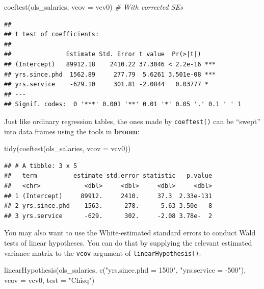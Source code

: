 \documentclass[
  12pt,
  oneside,openany]{book}
\newenvironment{Shaded}{\begin{snugshade}}{\end{snugshade}}
\newcommand{\AttributeTok}[1]{\textcolor[rgb]{0.77,0.63,0.00}{#1}}
\newcommand{\CommentTok}[1]{\textcolor[rgb]{0.56,0.35,0.01}{\textit{#1}}}
\newcommand{\FunctionTok}[1]{\textcolor[rgb]{0.00,0.00,0.00}{#1}}
\newcommand{\NormalTok}[1]{#1}
\newcommand{\StringTok}[1]{\textcolor[rgb]{0.31,0.60,0.02}{#1}}
\begin{document}
\begin{Shaded}
\begin{Highlighting}[]
\FunctionTok{coeftest}\NormalTok{(ols\_salaries, }\AttributeTok{vcov =}\NormalTok{ vcv0)  }\CommentTok{\# With corrected SEs}
\end{Highlighting}
\end{Shaded}

\begin{verbatim}
## 
## t test of coefficients:
## 
##               Estimate Std. Error t value  Pr(>|t|)    
## (Intercept)   89912.18    2410.22 37.3046 < 2.2e-16 ***
## yrs.since.phd  1562.89     277.79  5.6261 3.501e-08 ***
## yrs.service    -629.10     301.81 -2.0844   0.03777 *  
## ---
## Signif. codes:  0 '***' 0.001 '**' 0.01 '*' 0.05 '.' 0.1 ' ' 1
\end{verbatim}

Just like ordinary regression tables, the ones made by \texttt{coeftest()} can be ``swept'' into data frames using the tools in \textbf{broom}:

\begin{Shaded}
\begin{Highlighting}[]
\FunctionTok{tidy}\NormalTok{(}\FunctionTok{coeftest}\NormalTok{(ols\_salaries, }\AttributeTok{vcov =}\NormalTok{ vcv0))}
\end{Highlighting}
\end{Shaded}

\begin{verbatim}
## # A tibble: 3 x 5
##   term          estimate std.error statistic   p.value
##   <chr>            <dbl>     <dbl>     <dbl>     <dbl>
## 1 (Intercept)     89912.     2410.     37.3  2.33e-131
## 2 yrs.since.phd    1563.      278.      5.63 3.50e-  8
## 3 yrs.service      -629.      302.     -2.08 3.78e-  2
\end{verbatim}

You may also want to use the White-estimated standard errors to conduct Wald tests of linear hypotheses. You can do that by supplying the relevant estimated variance matrix to the \texttt{vcov} argument of \texttt{linearHypothesis()}:

\begin{Shaded}
\begin{Highlighting}[]
\FunctionTok{linearHypothesis}\NormalTok{(ols\_salaries,}
                 \FunctionTok{c}\NormalTok{(}\StringTok{"yrs.since.phd = 1500"}\NormalTok{, }\StringTok{"yrs.service = {-}500"}\NormalTok{),}
                 \AttributeTok{vcov =}\NormalTok{ vcv0,}
                 \AttributeTok{test =} \StringTok{"Chisq"}\NormalTok{)}
\end{Highlighting}
\end{Shaded}
\end{document}
